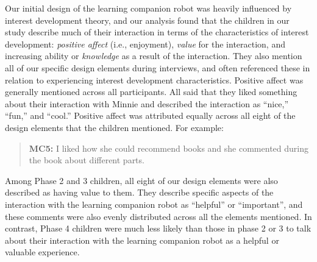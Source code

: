 \documentclass{sigchi}
\begin{document}
Our initial design of the learning companion robot was heavily influenced by interest development theory, and our analysis found that the children in our study describe much of their interaction in terms of the characteristics of interest development: \textit{positive affect} (i.e., enjoyment), \textit{value} for the interaction, and increasing ability or \textit{knowledge} as a result of the interaction. They also mention all of our specific design elements during interviews, and often referenced these in relation to experiencing interest development characteristics. Positive affect was generally mentioned across all participants. All said that they liked something about their interaction with Minnie and described the interaction as ``nice,'' ``fun,'' and ``cool.'' Positive affect was attributed equally across all eight of the design elements that the children mentioned. For example:

	\begin{quote}
		\textbf{MC5:} I liked how she could recommend books and she commented during the book about different parts.
	\end{quote}
		
Among Phase 2 and 3 children, all eight of our design elements were also described as having value to them. They describe specific aspects of the interaction with the learning companion robot as ``helpful'' or ``important'', and these comments were also evenly distributed across all the elements mentioned. In contrast, Phase 4 children were much less likely than those in phase 2 or 3 to talk about their interaction with the learning companion robot as a helpful or valuable experience. 
\end{document}
